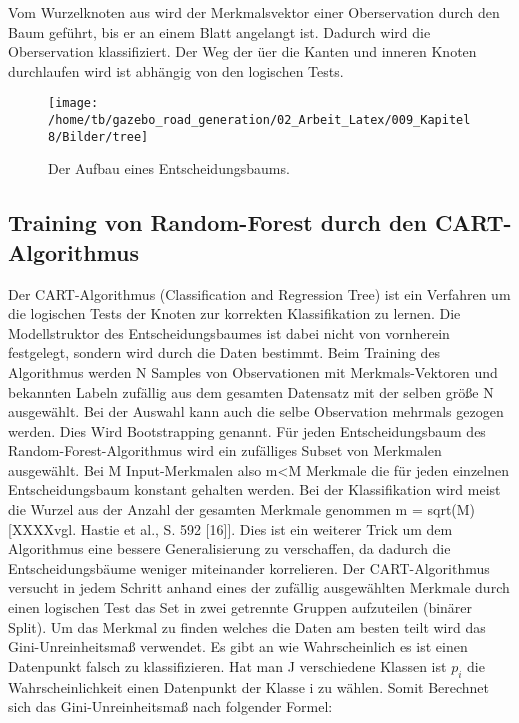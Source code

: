 Vom Wurzelknoten aus wird der Merkmalsvektor einer Oberservation durch den Baum gef{\"u}hrt, bis er an einem Blatt angelangt ist. Dadurch wird die Oberservation klassifiziert.
Der Weg der {\"u}er die Kanten und inneren Knoten durchlaufen wird ist abh{\"a}ngig von den logischen Tests.



\begin{figure}[H]
\begin{center}
  \texttt{[image: /home/tb/gazebo\_road\_generation/02\_Arbeit\_Latex/009\_Kapitel8/Bilder/tree]}%
  \caption[Der Aufbau eines Entscheidungsbaums]%
           {\label{fig:Aufbau eines Entscheidungsbaums}%
           Der Aufbau eines Entscheidungsbaums.
           }
\end{center}
\end{figure}

\subsection{Training von Random-Forest durch den CART-Algorithmus}
\label{subsec:Training von Random-Forest durch den CART-Algorithmus}

Der CART-Algorithmus (Classification and Regression Tree) ist ein Verfahren um die logischen Tests der Knoten zur korrekten Klassifikation zu lernen. Die Modellstruktor des Entscheidungsbaumes ist dabei nicht von vornherein festgelegt, sondern wird durch die Daten bestimmt. 
Beim Training des Algorithmus werden N Samples von Observationen mit Merkmals-Vektoren und bekannten Labeln zuf{\"a}llig aus dem gesamten Datensatz mit der selben gr{\"o}{\ss}e N ausgew{\"a}hlt. Bei der Auswahl kann auch die selbe Observation mehrmals gezogen werden. Dies Wird  Bootstrapping genannt. 
F{\"u}r jeden Entscheidungsbaum des Random-Forest-Algorithmus wird ein zuf{\"a}lliges Subset von Merkmalen ausgew{\"a}hlt. Bei M Input-Merkmalen also m<M Merkmale die f{\"u}r jeden einzelnen Entscheidungsbaum konstant gehalten werden. Bei der Klassifikation wird meist die Wurzel aus der Anzahl der gesamten Merkmale genommen m = sqrt(M) [XXXXvgl. Hastie et al., S. 592 [16]]. Dies ist ein weiterer Trick um dem Algorithmus eine bessere Generalisierung zu verschaffen, da dadurch die Entscheidungsb{\"a}ume weniger miteinander korrelieren.
Der CART-Algorithmus versucht in jedem Schritt anhand eines der zuf{\"a}llig ausgew{\"a}hlten Merkmale durch einen logischen Test das Set in zwei getrennte Gruppen aufzuteilen (bin{\"a}rer Split). Um das Merkmal zu finden welches die Daten am besten teilt wird das Gini-Unreinheitsma{\ss} verwendet. Es gibt an wie Wahrscheinlich es ist einen Datenpunkt falsch zu klassifizieren.
Hat man J verschiedene Klassen ist  $p_i$ die Wahrscheinlichkeit einen Datenpunkt der Klasse i zu w{\"a}hlen. Somit Berechnet sich das Gini-Unreinheitsma{\ss} nach folgender Formel:

